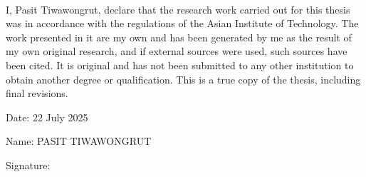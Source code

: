 
\setlength{\parindent}{0pt}
\setlength{\parskip}{1em}
\setlength{\baselineskip}{1.5em} %

\begin{center}
  \fontsize{14}{17} \\
\end{center}
\vspace{2em} 

I, Pasit Tiwawongrut, declare that the research work carried out for this thesis was in accordance with the regulations of the Asian Institute of Technology.
The work presented in it are my own and has been generated by me as the result of my own original research, and if external sources were used, such sources have been cited.
It is original and has not been submitted to any other institution to obtain another degree or qualification. This is a true copy of the thesis, including final revisions.

Date: 22 July 2025

Name: PASIT TIWAWONGRUT

Signature:

